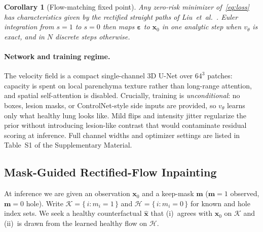 \documentclass[letterpaper]{article} %
\newtheorem{corollary}{Corollary}
\newcommand{\suppTabHparams}{Table~S1}
\begin{document}
\begin{corollary}[Flow-matching fixed point]
\label{cor:fm}
Any zero-risk minimizer of~\eqref{eq:loss} has characteristics given by the
rectified straight paths of Liu~et~al.~\cite{liu2023flow}.
Euler integration from \(s{=}1\) to \(s{=}0\) then maps
\(\boldsymbol{\varepsilon}\) to \(\mathbf{x}_0\) in one analytic step when
\(v_\theta\) is exact, and in \(N\) discrete steps otherwise.
\end{corollary}

\paragraph{Network and training regime.}
The velocity field is a compact single-channel 3D U-Net over \(64^{3}\)
patches: capacity is spent on local parenchyma texture rather than
long-range attention, and spatial self-attention is disabled.
Crucially, training is \emph{unconditional}: no boxes, lesion masks, or
ControlNet-style side inputs are provided, so \(v_\theta\) learns only
what healthy lung looks like.
Mild flips and intensity jitter regularize the prior without introducing
lesion-like contrast that would contaminate residual scoring at inference.
Full channel widths and optimizer settings are listed in
\suppTabHparams{} of the Supplementary Material.

\subsection{Mask-Guided Rectified-Flow Inpainting}
\label{sec:method:repaint}

At inference we are given an observation \(\mathbf{x}_0\) and a keep-mask
\(\mathbf{m}\) (\(\mathbf{m}=1\) observed, \(\mathbf{m}=0\) hole).
Write \(\mathcal{K}=\{\,i:m_i=1\,\}\) and \(\mathcal{H}=\{\,i:m_i=0\,\}\)
for known and hole index sets.
We seek a healthy counterfactual \(\hat{\mathbf{x}}\) that
(i)~agrees with \(\mathbf{x}_0\) on \(\mathcal{K}\) and
(ii)~is drawn from the learned healthy flow on \(\mathcal{H}\).
\end{document}
